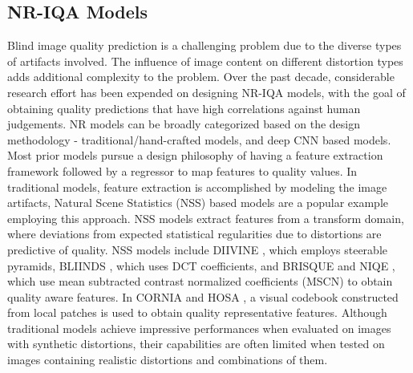 \documentclass[journal]{IEEEtran}
\begin{document}
\subsection{NR-IQA Models}
Blind image quality prediction is a challenging problem due to the diverse types of artifacts involved. The influence of image content on different distortion types adds additional complexity to the problem. Over the past decade, considerable research effort has been expended on designing NR-IQA models, with the goal of obtaining quality predictions that have high correlations against human judgements. NR models can be broadly categorized based on the design methodology - traditional/hand-crafted models, and deep CNN based models. Most prior models pursue a design philosophy of having a feature extraction framework followed by a regressor to map features to quality values. In traditional models, feature extraction is accomplished by modeling the image artifacts, Natural Scene Statistics (NSS) based models are a popular example employing this approach. NSS models extract features from a transform domain, where deviations from expected statistical regularities due to distortions are predictive of quality. NSS models include DIIVINE \cite{moorthy2011blind}, which employs steerable pyramids, BLIINDS \cite{saad2012blind}, which uses DCT coefficients, and BRISQUE \cite{mittal2012no} and NIQE \cite{mittal2013making}, which use mean subtracted contrast normalized coefficients (MSCN) to obtain quality aware features. In CORNIA \cite{ye2012unsupervised} and HOSA \cite{xu2016blind}, a visual codebook constructed from local patches is used to obtain quality representative features. Although traditional models achieve impressive performances when evaluated on images with synthetic distortions, their capabilities are often limited when tested on images containing realistic distortions and combinations of them.
\end{document}
